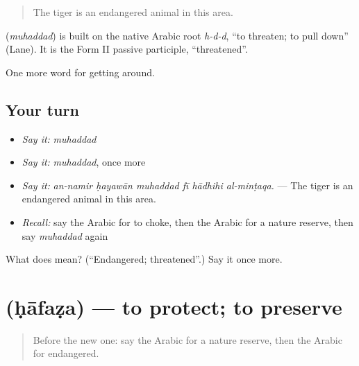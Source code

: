 \begin{quote}
The tiger is an endangered animal in this area.
\end{quote}

\begin{cousinweb}
\textbf{} (\emph{muhaddad}) is built on the native Arabic root \emph{h-d-d}, \textquotedblleft{}to threaten; to pull down\textquotedblright{} (Lane). It is the Form II passive participle, \textquotedblleft{}threatened\textquotedblright{}.
\end{cousinweb}

\begin{grammarlens}[title={What you've built}]
One more word for getting around.
\end{grammarlens}

\subsection*{Your turn}
\begin{itemize}
\raggedright
  \item \emph{Say it:} \emph{muhaddad}
  \item \emph{Say it:} \emph{muhaddad}, once more
  \item \emph{Say it:} \emph{an-namir ḥayawān muhaddad fī hādhihi al-minṭaqa.} — The tiger is an endangered animal in this area.
  \item \emph{Recall:} say the Arabic for to choke, then the Arabic for a nature reserve, then say \emph{muhaddad} again
\end{itemize}

\begin{tcolorbox}[breakable,colback=teal!4,colframe=teal!35!black,title={Before you move on}]
What does  mean? (\textquotedblleft{}Endangered; threatened\textquotedblright{}.) Say it once more.
\end{tcolorbox}
\section[\texorpdfstring{\ar{حافظ} (ḥāfaẓa)}{حافظ (ḥāfaẓa)}]{ (ḥāfaẓa) — to protect; to preserve}

\label{lesson:AR-C467-hafaza}



\begin{quote}
Before the new one: say the Arabic for a nature reserve, then the Arabic for endangered.
\end{quote}

